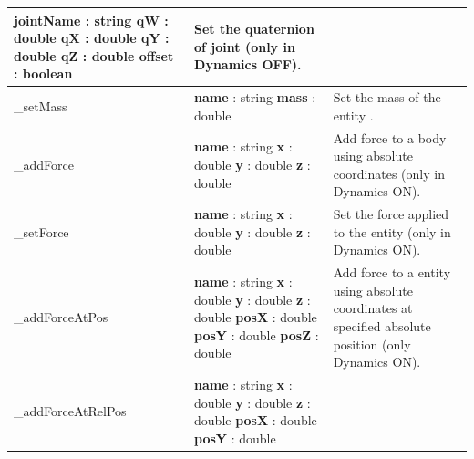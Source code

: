 \documentclass[notitlepage]{report}
\begin{document}
\begin{supertabular}{|p{2.9cm}|p{4.5cm}|p{7cm}|}
  		\textbf{jointName} : string \newline
  		\textbf{qW} : double \newline
  		\textbf{qX} : double \newline
  		\textbf{qY} : double \newline
  		\textbf{qZ} : double \newline
  		\textbf{offset} : boolean 
  		& Set the quaternion of joint (only in Dynamics OFF).\\
  	\hline
  	\_setMass & 
  		\textbf{name} : string \newline
  		\textbf{mass} : double
  		& Set the mass of the entity .\\
  	\hline
  	\_addForce & 
  		\textbf{name} : string \newline
  		\textbf{x} : double \newline
  		\textbf{y} : double \newline
  		\textbf{z} : double
  		& Add force to a body using absolute coordinates (only in Dynamics ON).\\
  	\hline
  	\_setForce & 
  		\textbf{name} : string \newline
  		\textbf{x} : double \newline
  		\textbf{y} : double \newline
  		\textbf{z} : double
  		& Set the force applied to the entity (only in Dynamics ON).\\
  	\hline
  	\_addForceAtPos & 
  		\textbf{name} : string \newline
  		\textbf{x} : double \newline
  		\textbf{y} : double \newline
  		\textbf{z} : double \newline
  		\textbf{posX} : double \newline
  		\textbf{posY} : double \newline
  		\textbf{posZ} : double
  		& Add force to a entity using absolute coordinates at specified absolute position (only Dynamics ON).\\
  	\hline
  	\_addForceAtRelPos & 
  		\textbf{name} : string \newline
  		\textbf{x} : double \newline
  		\textbf{y} : double \newline
  		\textbf{z} : double \newline
  		\textbf{posX} : double \newline
  		\textbf{posY} : double \newline

\end{supertabular}
\end{document}
